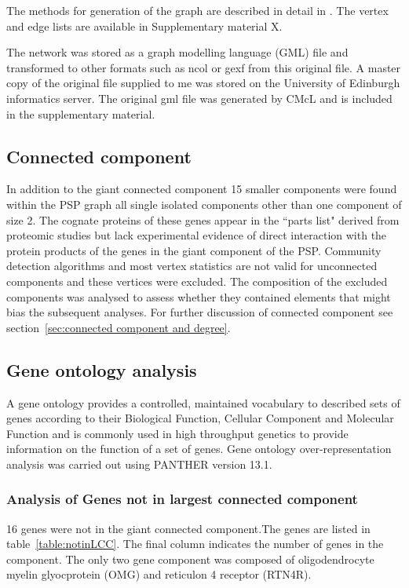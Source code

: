 The methods for generation of the graph are described in detail in \cite{heil2018systems}. The vertex and edge lists are available in Supplementary material X. 

The network was stored as a graph modelling language (GML) file and transformed to other formats such as ncol or gexf from this original file.\cite{himsolt1997gml}  A master copy of the original file supplied to me was stored on the University of Edinburgh informatics server. The original gml file was generated by CMcL and is included in the supplementary material.

\subsection{Connected component}
\label{sec: PSP graph connected component and missing}
In addition to the giant connected component 15 smaller components were found within the PSP graph all single isolated components other than one component of size 2. The cognate proteins of these genes appear in the ``parts list" derived from proteomic studies but lack experimental evidence of direct interaction with the protein products of the genes in the giant component of the PSP. Community detection algorithms and most vertex statistics are not valid for unconnected components and these vertices were excluded. The composition of the excluded components was analysed  to assess whether they contained elements that might bias the subsequent analyses.  For further discussion of connected component see section~\ref{sec:connected component and degree}.

\subsection{Gene ontology analysis}
\label{sec: gene ontology analysis}
A gene ontology provides a controlled, maintained vocabulary to described sets of genes according to their Biological Function, Cellular Component and Molecular Function and is commonly used in high throughput genetics to provide information on the function of a set of genes. \cite{ashburner2000gene}
Gene ontology over-representation analysis was carried out using PANTHER version 13.1.\cite{mi2013large}



\subsubsection{Analysis of Genes not in largest connected component}
\label{sec:analysis of genes not in largest component}
16 genes were not in the giant connected component.The genes are listed in table~\ref{table:notinLCC}. The final column indicates the number of genes in the component. The only two gene component was composed of oligodendrocyte myelin glyocprotein (OMG) and reticulon 4 receptor (RTN4R). 

